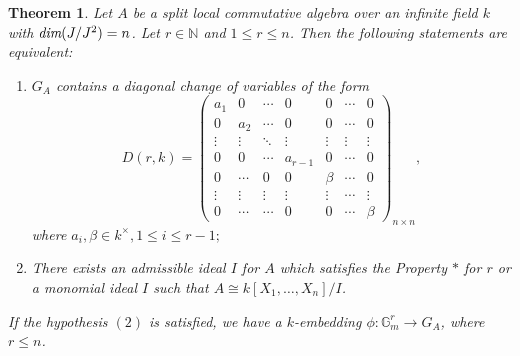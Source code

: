 \documentclass[12pt]{amsart}
\newtheorem{theorem}{Theorem}[section]
\theoremstyle{definition}
\numberwithin{equation}{section}
\begin{document}
\begin{theorem}\label{Theorem 5.25}
Let $A$ be a split local commutative algebra over an infinite field $k$ with $\emph{dim}(J/J^2)=n$. Let $r\in \mathbb{N}$ and $1\leq r\leq n$. Then the following statements are equivalent:
\begin{enumerate}
    \vskip4mm
    \item $G_A$ contains a diagonal change of variables of the form \[D(r,k)=
\begin{pmatrix}
a_1 & 0 &\cdots & 0 & 0 & \cdots & 0 \\
0 & a_2 & \cdots & 0 & 0 & \cdots & 0\\
\vdots & \vdots & \ddots & \vdots& \vdots & \vdots & \vdots\\
0 & 0 & \cdots & a_{r-1} & 0 &\cdots & 0 \\
0 & \cdots & 0 & 0 & \beta & \cdots & 0\\
\vdots & \vdots & \vdots & \vdots & \vdots & \cdots & \vdots\\
0 & \cdots & \cdots & 0 & 0 & \cdots & \beta
\end{pmatrix}_{n\times n}
,\]
where $a_i,\beta\in k^{\times}, 1\leq i\leq r-1;$
\vskip4mm
     \item There exists an admissible ideal $I$ for $A$ which satisfies the Property $*$ for $r$ or a monomial ideal $I$ such that $A\cong k[X_1,\dots,X_n]/I$.
\end{enumerate}
\vskip4mm
If the hypothesis $(2)$ is satisfied, we have a $k$-embedding $\phi: \mathbb{G}_m^{r}\rightarrow G_A$, where $r\leq n$. 
\end{theorem}
\vskip1mm
\end{document}
